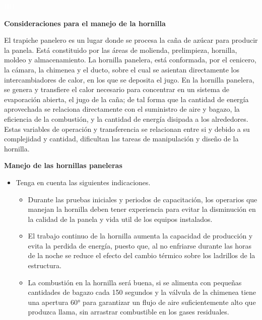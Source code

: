 \documentclass{article}%
\begin{document}
%
\newpage%
\textcolor{white}{ 
HH
}%
\newpage%
\begin{large}%
\begin{Large}%
\textbf{Consideraciones para el manejo de la hornilla}%
\end{Large}%
\newline%
 \newline%
El trapiche panelero es un lugar donde se procesa la caña de azúcar para producir la panela. Está constituido por las áreas de molienda, prelimpieza, hornilla, moldeo y almacenamiento.%
\newline%
 La hornilla panelera, está conformada, por el cenicero, la cámara, la chimenea y el ducto, sobre el cual se asientan directamente los intercambiadores de calor, en los que se deposita el jugo. En la hornilla panelera, se genera y transfiere el calor necesario para concentrar en un sistema de evaporación abierta, el jugo de la caña; de tal forma que la cantidad de energía aprovechada se relaciona directamente con el suministro de aire y bagazo, la eficiencia de la combustión, y la cantidad de energía disipada a los alrededores. Estas variables de operación y transferencia se relacionan entre si y debido a su complejidad y cantidad, dificultan las tareas de manipulación y diseño de la hornilla.%
\begin{Large}%
\textbf{\newline%
 \newline%
 Manejo de las hornillas paneleras}%
\end{Large}%
\begin{itemize}%
\item%
Tenga en cuenta las siguientes indicaciones.%
\begin{itemize}%
\item%
Durante las pruebas iniciales y periodos de capacitación, los operarios que manejan la hornilla deben tener experiencia para evitar la disminución en la calidad de la panela y vida util de los equipos instalados.%
\item%
El trabajo continuo de la hornilla aumenta la capacidad de producción y evita la perdida de energía, puesto que, al no enfriarse durante las horas de la noche se reduce el efecto del cambio térmico sobre los ladrillos de la estructura.%
\item%
La combustión en la hornilla será buena, si se alimenta con pequeñas cantidades de bagazo cada 150 segundos y la válvula de la chimenea tiene una apertura 60° para garantizar un flujo de aire suficientemente alto que produzca llama, sin arrastrar combustible en los gases residuales.%

\end{itemize}
\end{itemize}
\end{large}
\end{document}
